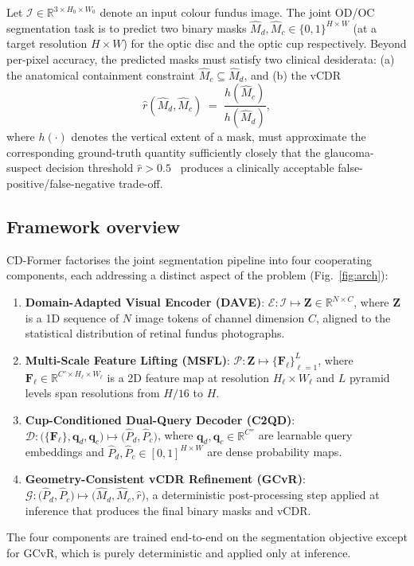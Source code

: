 \documentclass[10pt,journal,twocolumn]{IEEEtran}
\begin{document}
Let $\mathcal{I} \in \mathbb{R}^{3 \times H_0 \times W_0}$ denote an input colour fundus image. The joint OD/OC segmentation task is to predict two binary masks $\hat{M}_d, \hat{M}_c \in \{0,1\}^{H \times W}$ (at a target resolution $H \times W$) for the optic disc and the optic cup respectively. Beyond per-pixel accuracy, the predicted masks must satisfy two clinical desiderata: (a) the anatomical containment constraint $\hat{M}_c \subseteq \hat{M}_d$, and (b) the vCDR
\begin{equation}
\hat{r}(\hat{M}_d, \hat{M}_c) \;=\; \frac{h(\hat{M}_c)}{h(\hat{M}_d)},
\label{eq:vcdr}
\end{equation}
where $h(\cdot)$ denotes the vertical extent of a mask, must approximate the corresponding ground-truth quantity sufficiently closely that the glaucoma-suspect decision threshold $\hat{r} > 0.5$~\cite{li2023rdcnn} produces a clinically acceptable false-positive/false-negative trade-off.

\subsection{Framework overview}

CD-Former factorises the joint segmentation pipeline into four cooperating components, each addressing a distinct aspect of the problem (Fig.~\ref{fig:arch}):
\begin{enumerate}
  \item \textbf{Domain-Adapted Visual Encoder (DAVE)}: $\mathcal{E}: \mathcal{I} \mapsto \mathbf{Z} \in \mathbb{R}^{N \times C}$, where $\mathbf{Z}$ is a 1D sequence of $N$ image tokens of channel dimension $C$, aligned to the statistical distribution of retinal fundus photographs.
  \item \textbf{Multi-Scale Feature Lifting (MSFL)}: $\mathcal{P}: \mathbf{Z} \mapsto \{\mathbf{F}_\ell\}_{\ell=1}^{L}$, where $\mathbf{F}_\ell \in \mathbb{R}^{C' \times H_\ell \times W_\ell}$ is a 2D feature map at resolution $H_\ell \times W_\ell$ and $L$ pyramid levels span resolutions from $H/16$ to $H$.
  \item \textbf{Cup-Conditioned Dual-Query Decoder (C2QD)}: $\mathcal{D}: \big(\{\mathbf{F}_\ell\}, \mathbf{q}_d, \mathbf{q}_c\big) \mapsto \big(\hat{P}_d, \hat{P}_c\big)$, where $\mathbf{q}_d, \mathbf{q}_c \in \mathbb{R}^{C''}$ are learnable query embeddings and $\hat{P}_d, \hat{P}_c \in [0,1]^{H \times W}$ are dense probability maps.
  \item \textbf{Geometry-Consistent vCDR Refinement (GCvR)}: $\mathcal{G}: \big(\hat{P}_d, \hat{P}_c\big) \mapsto \big(\hat{M}_d, \hat{M}_c, \hat{r}\big)$, a deterministic post-processing step applied at inference that produces the final binary masks and vCDR.
\end{enumerate}
The four components are trained end-to-end on the segmentation objective except for GCvR, which is purely deterministic and applied only at inference.
\end{document}
